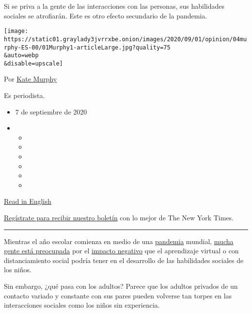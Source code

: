 Si se priva a la gente de las interacciones con las personas, sus
habilidades sociales se atrofiarán. Este es otro efecto secundario de la
pandemia.

\texttt{[image: https://static01.graylady3jvrrxbe.onion/images/2020/09/01/opinion/04murphy-ES-00/01Murphy1-articleLarge.jpg?quality=75\\\&auto=webp\\\&disable=upscale]}

Por \href{https://www.nytimes3xbfgragh.onion/by/kate-murphy}{Kate
Murphy}

Es periodista.

\begin{itemize}
\item
  7 de septiembre de 2020
\item
  \begin{itemize}
  \item
  \item
  \item
  \item
  \item
  \item
  \end{itemize}
\end{itemize}

\href{https://www.nytimes3xbfgragh.onion/2020/09/01/sunday-review/coronavirus-socially-awkward.html}{Read
in English}

\href{https://www.nytimes3xbfgragh.onion/newsletters/el-times}{Regístrate
para recibir nuestro boletín} con lo mejor de The New York Times.

\begin{center}\rule{0.5\linewidth}{\linethickness}\end{center}

Mientras el año escolar comienza en medio de una
\href{https://www.nytimes3xbfgragh.onion/2020/09/02/world/covid-19-coronavirus.html}{pandemia}
mundial,
\href{https://www.bbc.com/future/article/20200603-how-covid-19-is-changing-the-worlds-children}{mucha
gente está preocupada} por el
\href{https://www.theatlantic.com/family/archive/2020/06/how-quarantine-will-affect-kids-social-development/613381/}{impacto
negativo} que el aprendizaje virtual o con distanciamiento social podría
tener en el desarrollo de las habilidades sociales de los niños.

Sin embargo, ¿qué pasa con los adultos? Parece que los adultos privados
de un contacto variado y constante con sus pares pueden volverse tan
torpes en las interacciones sociales como los niños sin experiencia.

